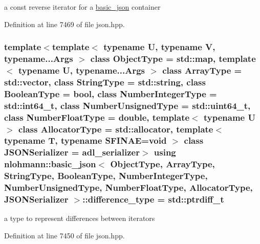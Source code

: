 a const reverse iterator for a \hyperlink{classnlohmann_1_1basic__json}{basic\+\_\+json} container 



Definition at line 7469 of file json.\+hpp.

\subsubsection[{\texorpdfstring{difference\+\_\+type}{difference_type}}]{\setlength{\rightskip}{0pt plus 5cm}template$<$template$<$ typename U, typename V, typename...\+Args $>$ class Object\+Type = std\+::map, template$<$ typename U, typename...\+Args $>$ class Array\+Type = std\+::vector, class String\+Type  = std\+::string, class Boolean\+Type  = bool, class Number\+Integer\+Type  = std\+::int64\+\_\+t, class Number\+Unsigned\+Type  = std\+::uint64\+\_\+t, class Number\+Float\+Type  = double, template$<$ typename U $>$ class Allocator\+Type = std\+::allocator, template$<$ typename T, typename S\+F\+I\+N\+A\+E=void $>$ class J\+S\+O\+N\+Serializer = adl\+\_\+serializer$>$ using {\bf nlohmann\+::basic\+\_\+json}$<$ Object\+Type, Array\+Type, String\+Type, Boolean\+Type, Number\+Integer\+Type, Number\+Unsigned\+Type, Number\+Float\+Type, Allocator\+Type, J\+S\+O\+N\+Serializer $>$\+::{\bf difference\+\_\+type} =  std\+::ptrdiff\+\_\+t}\hypertarget{classnlohmann_1_1basic__json_afe7c1303357e19cea9527af4e9a31d8f}{}\label{classnlohmann_1_1basic__json_afe7c1303357e19cea9527af4e9a31d8f}


a type to represent differences between iterators 



Definition at line 7450 of file json.\+hpp.

